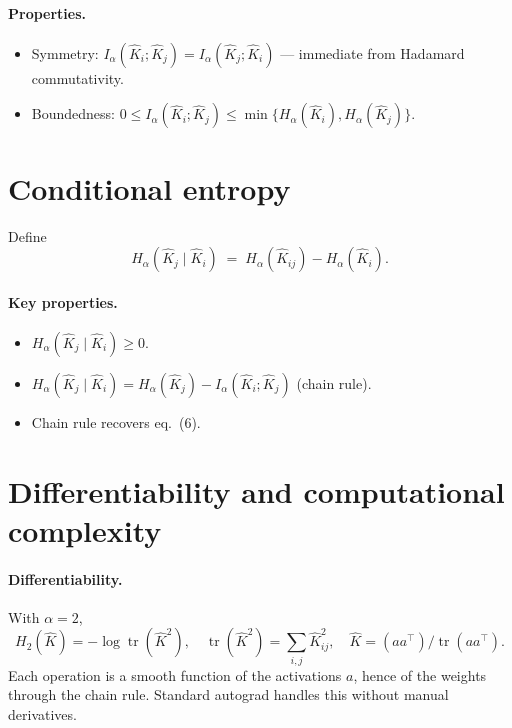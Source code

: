 \documentclass[11pt,a4paper]{article}
\newcommand{\trace}{\operatorname{tr}}
\newcommand{\Khat}{\hat{K}}
\begin{document}
\paragraph{Properties.}
\begin{itemize}
  \item Symmetry: $I_\alpha(\Khat_i ; \Khat_j) = I_\alpha(\Khat_j ; \Khat_i)$
        --- immediate from Hadamard commutativity.
  \item Boundedness: $0 \leq I_\alpha(\Khat_i ; \Khat_j) \leq
        \min\{H_\alpha(\Khat_i), H_\alpha(\Khat_j)\}$.
\end{itemize}

\section{Conditional entropy}

Define
\begin{equation}
H_\alpha(\Khat_j \mid \Khat_i)
   \;=\; H_\alpha(\Khat_{ij}) - H_\alpha(\Khat_i). \tag{7}
\end{equation}

\paragraph{Key properties.}
\begin{itemize}
  \item $H_\alpha(\Khat_j \mid \Khat_i) \geq 0$.
  \item $H_\alpha(\Khat_j \mid \Khat_i) = H_\alpha(\Khat_j) -
        I_\alpha(\Khat_i ; \Khat_j)$ (chain rule).
  \item Chain rule recovers eq.~(6).
\end{itemize}

\section{Differentiability and computational complexity}

\paragraph{Differentiability.} With $\alpha = 2$,
\[
H_2(\Khat) = -\log \trace(\Khat^2),
\quad \trace(\Khat^2) = \sum_{i,j} \Khat_{ij}^2,
\quad \Khat = (a a^\top) / \trace(a a^\top).
\]
Each operation is a smooth function of the activations $a$, hence of the
weights through the chain rule. Standard autograd handles this without
manual derivatives.
\end{document}
